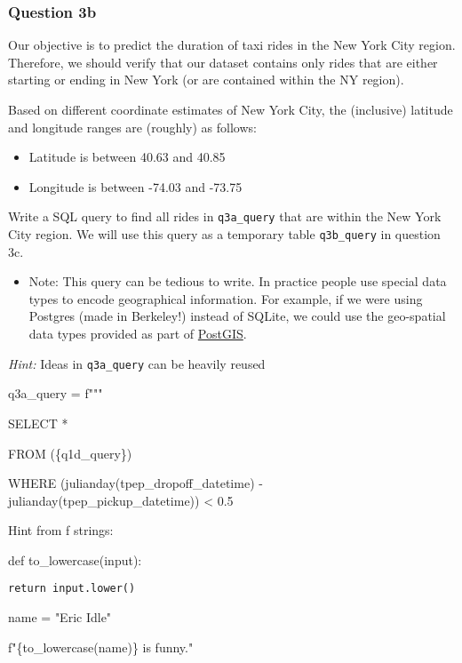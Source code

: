 \documentclass[11pt]{article}
\providecommand{\tightlist}{%
      \setlength{\itemsep}{0pt}\setlength{\parskip}{0pt}}
\begin{document}
    \subsubsection{Question 3b}\label{question-3b}

Our objective is to predict the duration of taxi rides in the New York
City region. Therefore, we should verify that our dataset contains only
rides that are either starting or ending in New York (or are contained
within the NY region).

Based on different coordinate estimates of New York City, the
(inclusive) latitude and longitude ranges are (roughly) as follows:

\begin{itemize}
\tightlist
\item
  Latitude is between 40.63 and 40.85
\item
  Longitude is between -74.03 and -73.75
\end{itemize}

Write a SQL query to find all rides in \texttt{q3a\_query} that are
within the New York City region. We will use this query as a temporary
table \texttt{q3b\_query} in question 3c.

\begin{itemize}
\tightlist
\item
  Note: This query can be tedious to write. In practice people use
  special data types to encode geographical information. For example, if
  we were using Postgres (made in Berkeley!) instead of SQLite, we could
  use the geo-spatial data types provided as part of
  \href{https://postgis.net/}{PostGIS}.
\end{itemize}

\emph{Hint:} Ideas in \texttt{q3a\_query} can be heavily reused

    q3a\_query = f"""

SELECT *

FROM (\{q1d\_query\})

WHERE (julianday(tpep\_dropoff\_datetime) -
julianday(tpep\_pickup\_datetime)) \textless{} 0.5

Hint from f strings:

def to\_lowercase(input):

\begin{verbatim}
return input.lower()
\end{verbatim}

name = "Eric Idle"

f"\{to\_lowercase(name)\} is funny."
\end{document}
